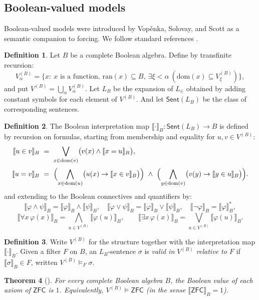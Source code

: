 \documentclass[11pt]{amsart}
\theoremstyle{definition}
\newtheorem{definition}{Definition}[section]
\theoremstyle{plain}
\newtheorem{theorem}[definition]{Theorem}
\newcommand{\Sent}{\mathsf{Sent}}
\newcommand{\LP}{L_{\in}} %
\newcommand{\LB}{L_B}     %
\newcommand{\val}[1]{\llbracket #1\rrbracket_B}
\begin{document}
\subsection{Boolean-valued models}

Boolean-valued models were introduced by Vop\v{e}nka, Solovay, and Scott as a semantic companion
to forcing. We follow standard references \cite{Bell,Jech}.

\begin{definition}
Let $B$ be a complete Boolean algebra. Define by transfinite recursion:
\[
V^{(B)}_\alpha=\{x:\ x \text{ is a function, }\mathrm{ran}(x)\subseteq B,\ \exists\xi<\alpha\ (\mathrm{dom}(x)\subseteq V^{(B)}_\xi)\},
\]
and put $V^{(B)}=\bigcup_\alpha V^{(B)}_\alpha$.
Let $\LB$ be the expansion of $\LP$ obtained by adding constant symbols for each element of $V^{(B)}$. And let $\Sent(L_B)$ be the class of corresponding sentences.
\end{definition}

\begin{definition}\label{def:boolean-interpretation}
The Boolean interpretation map $\val{\cdot}:\Sent(L_B)\to B$ is defined by recursion on formulas, starting
from membership and equality for $u,v\in V^{(B)}$:
\[
\begin{aligned}
\val{u\in v} \ &=\ \bigvee_{x\in\mathrm{dom}(v)}\bigl(v(x)\wedge \val{x=u}\bigr),\\[2pt]
\val{u=v} \ &=\ \Bigl(\bigwedge_{x\in\mathrm{dom}(u)}\bigl(u(x)\to \val{x\in v}\bigr)\Bigr)\ \wedge\
            \Bigl(\bigwedge_{y\in\mathrm{dom}(v)}\bigl(v(y)\to \val{y\in u}\bigr)\Bigr).
\end{aligned}
\]
and extending to the Boolean connectives and quantifiers by:
\[
\val{\varphi\wedge\psi}=\val{\varphi}\wedge\val{\psi},\quad
\val{\varphi\vee\psi}=\val{\varphi}\vee\val{\psi},\quad
\val{\neg\varphi}=\val{\varphi}^\ast,
\]
\[
\val{\forall x\,\varphi(x)}=\bigwedge_{u\in V^{(B)}}\val{\varphi(u)},
\qquad
\val{\exists x\,\varphi(x)}=\bigvee_{u\in V^{(B)}}\val{\varphi(u)}.
\]
\end{definition}

\begin{definition}
Write $V^{(B)}$ for the structure together with the interpretation map $\val{\cdot}$.
Given a filter $F$ on $B$, an $\LB$-sentence $\sigma$ is \emph{valid in $V^{(B)}$ relative to $F$} if
$\val{\sigma}\in F$, written $V^{(B)}\models_F \sigma$.
\end{definition}

\begin{theorem}[\cite{Bell}]\label{thm:zfc-boolean}
For every complete Boolean algebra $B$, the Boolean value of each axiom of $\mathsf{ZFC}$ is $1$.
Equivalently, $V^{(B)}\models \mathsf{ZFC}$ (in the sense $\val{\mathsf{ZFC}}=1$).
\end{theorem}
\end{document}
